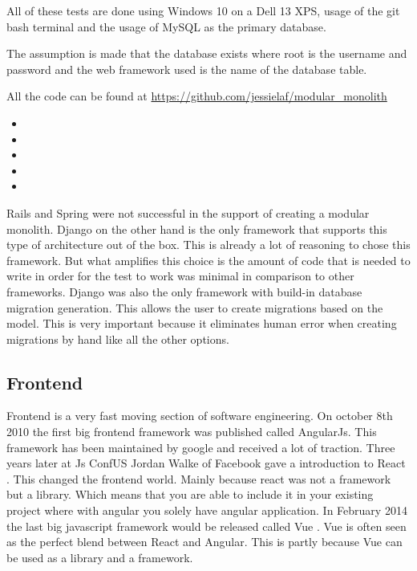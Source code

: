 All of these tests are done using Windows 10 on a Dell 13 XPS, usage of the git bash terminal and the usage of MySQL as the primary database.

The assumption is made that the database exists where root is the username and password and the web framework used is the name of the database table.

All the code can be found at \url{https://github.com/jessielaf/modular_monolith}

\begin{itemize}
    \item {}
    \item {}
    \item {}
    \item {}
    \item {}
\end{itemize}

Rails and Spring were not successful in the support of creating a modular monolith. Django on the other hand is the only framework that supports this type of architecture out of the box. This is already a lot of reasoning to chose this framework. But what amplifies this choice is the amount of code that is needed to write in order for the test to work was minimal in comparison to other frameworks. Django was also the only framework with build-in database migration generation. This allows the user to create migrations based on the model. This is very important because it eliminates human error when creating migrations by hand like all the other options.

\subsection{Frontend}

Frontend is a very fast moving section of software engineering. On october 8th 2010 \cite{angularJs} the first big frontend framework was published called AngularJs. This framework has been maintained by google and received a lot of traction. Three years later at Js ConfUS Jordan Walke of Facebook gave a introduction to React \cite{reactJs}. This changed the frontend world. Mainly because react was not a framework but a library. Which means that you are able to include it in your existing project where with angular you solely have angular application. In February 2014 the last big javascript framework would be released called Vue \cite{vueJs}. Vue is often seen as the perfect blend between React and Angular. This is partly because Vue can be used as a library and a framework.

